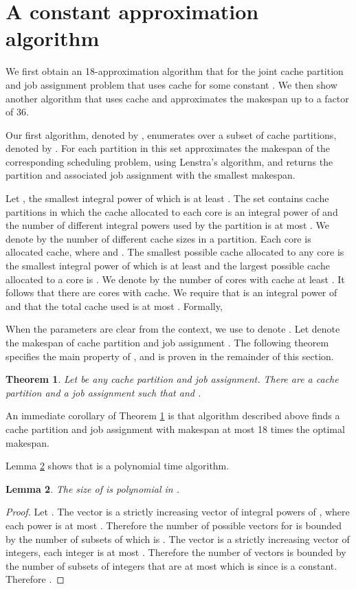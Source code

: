 \documentclass[11pt]{article}
\newtheorem{theorem}{Theorem}[section]
\newtheorem{lemma}[theorem]{Lemma}
\begin{document}
\section{A constant approximation algorithm}\label{sec_36}

We first obtain an 18-approximation algorithm that for the joint cache partition and job assignment problem that uses
 cache for some constant  .
We then show another algorithm that uses  cache and approximates the makespan up to a factor of 36.

Our first algorithm, denoted by , enumerates over a  subset of
cache partitions, denoted by . For each partition
in this set  approximates the makespan of  the corresponding
scheduling problem, using Lenstra's  algorithm, and returns the
partition and associated job assignment with the smallest makespan.

Let , the smallest integral power of  which is at least .
The set  contains cache partitions in which the cache allocated to each core is
an integral power of  and the number of different integral powers used by the partition is at most .
We denote by  the number of different cache sizes in a partition.
Each core is allocated  cache, where  and .
The smallest possible cache allocated to any core is the smallest integral power of  which is at least  and the largest possible cache allocated to a core is .
We denote by  the number of cores with cache at least .
It follows that there are  cores with   cache.
We require that  is an integral power of  and that the total cache used is at most .
Formally,

When the parameters are clear from the context, we use  to denote
. Let  denote the makespan of cache
partition  and job assignment . The following theorem
specifies the main property of , and is proven in the remainder of this section.
\begin{theorem}\label{P9thm}
Let  be any cache partition and job assignment. There are
a cache partition and a job assignment  such that
 and .
\end{theorem}

An immediate corollary of Theorem  \ref{P9thm} is that algorithm 
described above finds a cache partition and job assignment with
makespan  at most 18 times the optimal makespan.

Lemma \ref{lem_poly} shows that  is a polynomial time algorithm.

\begin{lemma}\label{lem_poly}
The size of  is polynomial in .
\end{lemma}
\begin{proof}
Let  .
The vector  is a strictly increasing vector of integral powers of , where each power is at most . Therefore the number of possible vectors for  is bounded by the number of subsets of  which is .
The vector  is a strictly increasing vector of integers, each integer is at most .
Therefore the number of vectors  is bounded by the number of subsets of integers that are at most  which is  since  is a constant.
Therefore .
\end{proof}
\end{document}
